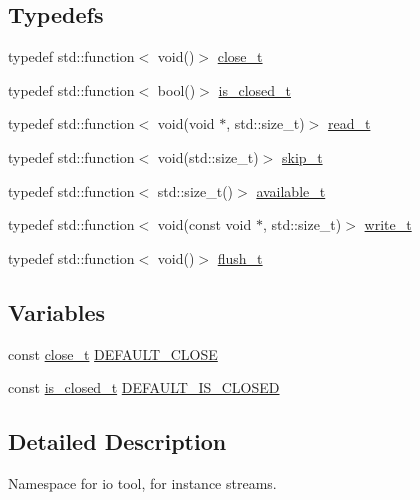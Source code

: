 \subsection*{Typedefs}
\begin{DoxyCompactItemize}
\item 
typedef std\+::function$<$ void()$>$ \hyperlink{namespacedevfix_1_1base_1_1io_ae3118387742e5f4d484a328a213d6a5d}{close\+\_\+t}
\item 
typedef std\+::function$<$ bool()$>$ \hyperlink{namespacedevfix_1_1base_1_1io_a14f89d4437ced6ede49c044ee8e71f17}{is\+\_\+closed\+\_\+t}
\item 
typedef std\+::function$<$ void(void $\ast$, std\+::size\+\_\+t)$>$ \hyperlink{namespacedevfix_1_1base_1_1io_ae311e0a7c5c8f064e222933e152aff64}{read\+\_\+t}
\item 
typedef std\+::function$<$ void(std\+::size\+\_\+t)$>$ \hyperlink{namespacedevfix_1_1base_1_1io_aeb8f94d85cfeaa405f53a6967e609645}{skip\+\_\+t}
\item 
typedef std\+::function$<$ std\+::size\+\_\+t()$>$ \hyperlink{namespacedevfix_1_1base_1_1io_a19c1195ab6a44e6d4f48b86062860a11}{available\+\_\+t}
\item 
typedef std\+::function$<$ void(const void $\ast$, std\+::size\+\_\+t)$>$ \hyperlink{namespacedevfix_1_1base_1_1io_aaa3124cddb420001b0296561c60f8fcd}{write\+\_\+t}
\item 
typedef std\+::function$<$ void()$>$ \hyperlink{namespacedevfix_1_1base_1_1io_a622685976c7f503411827fba028d3ce1}{flush\+\_\+t}
\end{DoxyCompactItemize}
\subsection*{Variables}
\begin{DoxyCompactItemize}
\item 
const \hyperlink{namespacedevfix_1_1base_1_1io_ae3118387742e5f4d484a328a213d6a5d}{close\+\_\+t} \hyperlink{namespacedevfix_1_1base_1_1io_a14a286c17d4b93881d42b1d14beb2d0b}{D\+E\+F\+A\+U\+L\+T\+\_\+\+C\+L\+O\+SE}
\item 
const \hyperlink{namespacedevfix_1_1base_1_1io_a14f89d4437ced6ede49c044ee8e71f17}{is\+\_\+closed\+\_\+t} \hyperlink{namespacedevfix_1_1base_1_1io_ae04fec2a2a2db3482e624a59e59a2a14}{D\+E\+F\+A\+U\+L\+T\+\_\+\+I\+S\+\_\+\+C\+L\+O\+S\+ED}
\end{DoxyCompactItemize}


\subsection{Detailed Description}
Namespace for io tool, for instance streams. 

